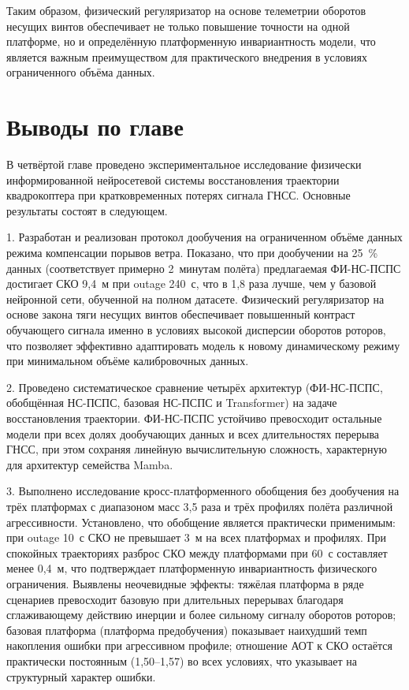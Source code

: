 Таким образом, физический регуляризатор на основе телеметрии оборотов несущих винтов обеспечивает не только повышение точности на одной платформе, но и определённую платформенную инвариантность модели, что является важным преимуществом для практического внедрения в условиях ограниченного объёма данных.


\section{Выводы по главе}
\label{sec:ch4_conclusions}

В четвёртой главе проведено экспериментальное исследование физически информированной нейросетевой системы восстановления траектории квадрокоптера при кратковременных потерях сигнала ГНСС. Основные результаты состоят в следующем.

1. Разработан и реализован протокол дообучения на ограниченном объёме данных режима компенсации порывов ветра. Показано, что при дообучении на 25~\% данных (соответствует примерно 2~минутам полёта) предлагаемая ФИ-НС-ПСПС достигает СКО 9,4~м при outage 240~с, что в 1,8 раза лучше, чем у базовой нейронной сети, обученной на полном датасете. Физический регуляризатор на основе закона тяги несущих винтов обеспечивает повышенный контраст обучающего сигнала именно в условиях высокой дисперсии оборотов роторов, что позволяет эффективно адаптировать модель к новому динамическому режиму при минимальном объёме калибровочных данных.

2. Проведено систематическое сравнение четырёх архитектур (ФИ-НС-ПСПС, обобщённая НС-ПСПС, базовая НС-ПСПС и Transformer) на задаче восстановления траектории. ФИ-НС-ПСПС устойчиво превосходит остальные модели при всех долях дообучающих данных и всех длительностях перерыва ГНСС, при этом сохраняя линейную вычислительную сложность, характерную для архитектур семейства Mamba.

3. Выполнено исследование кросс-платформенного обобщения без дообучения на трёх платформах с диапазоном масс 3,5 раза и трёх профилях полёта различной агрессивности. Установлено, что обобщение является практически применимым: при outage 10~с СКО не превышает 3~м на всех платформах и профилях. При спокойных траекториях разброс СКО между платформами при 60~с составляет менее 0,4~м, что подтверждает платформенную инвариантность физического ограничения. Выявлены неочевидные эффекты: тяжёлая платформа в ряде сценариев превосходит базовую при длительных перерывах благодаря сглаживающему действию инерции и более сильному сигналу оборотов роторов; базовая платформа (платформа предобучения) показывает наихудший темп накопления ошибки при агрессивном профиле; отношение АОТ к СКО остаётся практически постоянным (1,50–1,57) во всех условиях, что указывает на структурный характер ошибки.

